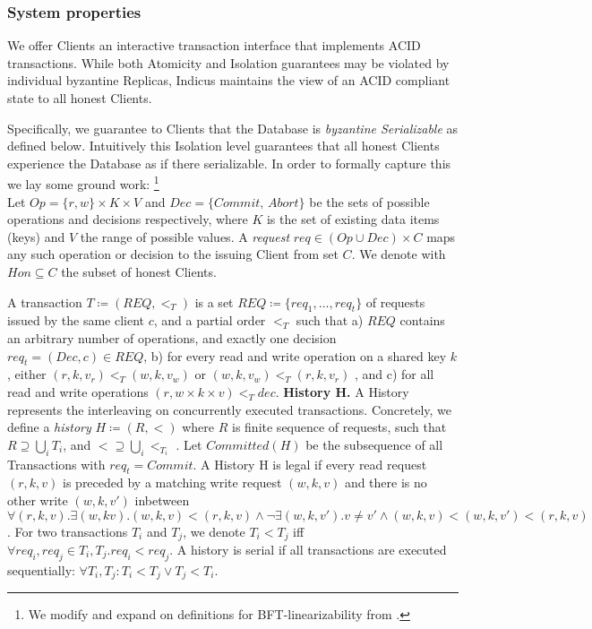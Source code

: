 \subsubsection{System properties}
We offer Clients an interactive transaction interface that implements ACID transactions. While both Atomicity  and Isolation guarantees may be violated by individual byzantine Replicas, Indicus maintains the view of an ACID compliant state to all honest Clients. 

Specifically, we guarantee to Clients that the Database is \textit{byzantine Serializable} as defined below. Intuitively this Isolation level guarantees that all honest Clients experience the Database as if there serializable. In order to formally capture this we lay some ground work: \footnote{We modify and expand on definitions for BFT-linearizability from \cite{liskov2006tolerating}. }\\

Let $Op =  \{r, w\} \times K \times V $ and $Dec = \{Commit, \,Abort\}$ be the sets of possible operations and decisions respectively, where $K$ is the set of existing data items (keys) and $V$ the range of possible values. A \textit{request} $req \in (Op \cup Dec) \times C$ maps any such operation or decision to the issuing Client from set $C$. We denote with $Hon \subseteq C$ the subset of honest Clients. 

 
A transaction $T \coloneqq (REQ, <_T)$ is a set $REQ \coloneqq \{req_1, \dots, req_t \}$ of requests issued by the same client $c$, and a partial order $<_T$ such that a) $REQ$ contains an arbitrary number of operations, and exactly one decision $req_t = (Dec, c) \in REQ$, b) for every read and write operation on a shared key $k$, either $(r, k, v_r) <_T (w, k, v_w)$ or $(w, k, v_w) <_T (r, k, v_r)$ , and c) for all read and write operations $({r,w} \times k \times v) <_T dec$.
\textbf{History H.} A History represents the interleaving on concurrently executed transactions. Concretely, we define a \textit{history} $H \coloneqq (R, <)$ where $R$ is finite sequence of
requests, such that $R \supseteq \bigcup_i T_i$, and $< \supseteq \bigcup_i <_{T_i}$ .
Let $Committed(H)$ be the subsequence of all Transactions with $req_{t} = Commit$. A History H is legal if every read request $(r, k, v)$ is preceded by a matching write request $(w, k, v)$ and there is no other write $(w, k, v')$ inbetween  $\forall (r, k, v).\exists (w, k v). (w,k,v) < (r,k,v) \land \neg \exists (w, k, v'). v\neq v' \land (w, k,v) < (w,k, v') < (r, k, v)$. For two transactions $T_i$ and $T_j$, we denote $T_i < T_j$ iff $\forall req_i, req_j \in T_i, T_j. req_i < req_j$. A history is serial if all transactions are executed sequentially: $\forall T_i, T_j: T_i < T_j \lor T_j < T_i$.

